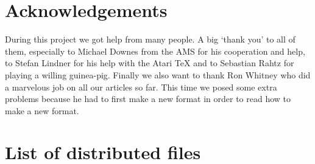 \section{Acknowledgements}

During this project we got help from many people. A big `thank you'
to all of them, especially to Michael Downes from the AMS for his
cooperation and help, to Stefan Lindner for his help with the
Atari \TeX{} and to Sebastian Rahtz for playing a willing
guinea-pig. Finally we also want to thank Ron Whitney who did a
marvelous job on all our articles so far. This time we posed some
extra problems because he had to first make a new format in
order to read how to make a new format.

 \section{List of distributed files}

